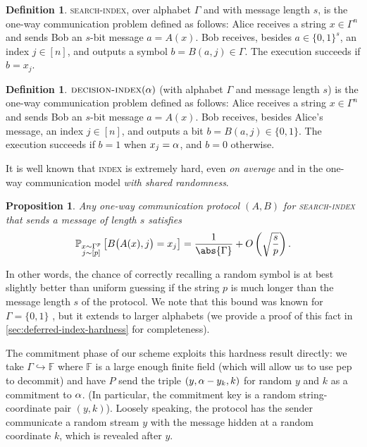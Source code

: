 \documentclass[a4paper,UKenglish,cleveref, autoref, thm-restate]{lipics-v2021}
\newtheorem{proposition}[theorem]{Proposition}
\theoremstyle{definition}
\newtheorem{definition}[theorem]{Definition}
\newcommand{\field}{\mathbb{F}}
\renewcommand{\P}{\mathbb P}
\newcommand{\bitset}{\{0,1\}}
\newcommand{\indexproblem}{\normalfont\textsc{index}\xspace}
\newcommand{\searchindex}{\normalfont\textsc{search-index}\xspace}
\newcommand{\decisionindex}{\normalfont\textsc{decision-index}\xspace}
\newcommand{\pepprotocol}{\textsf{pep}\xspace}
\newcommand{\pcommitlength}{p}
\newcommand{\pcommitstring}{y}
\newcommand{\alphabet}{\Gamma}
\def\fe#1{
    \ifnum#1=1
        \alpha
    \else
    \ifnum#1=2
        \beta
    \else
    \ifnum#1=3
        \gamma
    \fi\fi\fi
}
\begin{document}
\begin{definition}
    \label{def:search-index}
    \searchindex, over alphabet $\alphabet$ and with message length $s$, is the one-way communication problem defined as follows: Alice receives a string $x \in \alphabet^n$ and sends Bob an $s$-bit message $a = A(x)$. Bob receives, besides $a \in \bitset^s$, an index $j \in [n]$, and outputs a symbol $b = B(a, j) \in \alphabet$. The execution succeeds if $b = x_j$.
\end{definition}

\begin{definition}
    \label{def:decision-index}
    $\decisionindex(\fe1)$ (with alphabet $\alphabet$ and message length $s$) is the one-way communication problem defined as follows: Alice receives a string $x \in \alphabet^n$ and sends Bob an $s$-bit message $a = A(x)$. Bob receives, besides Alice's message, an index $j \in [n]$, and outputs a bit $b = B(a, j) \in \bitset$. The execution succeeds if $b = 1$ when $x_j = \fe1$, and $b = 0$ otherwise.
\end{definition}

It is well known that \indexproblem is extremely hard, even \emph{on average} and in the one-way communication model \emph{with shared randomness}. 

\begin{proposition}
\label{prop:index-hardness}
    Any one-way communication protocol $(A, B)$ for \searchindex that sends a message of length $s$ satisfies 
    \begin{equation*}
        \P_{\substack{x \sim \alphabet^\pcommitlength\\ j \sim [\pcommitlength]}}\left[B\big(A(x), j\big) = x_j\right] = \frac1{\abs{\alphabet}}+O\left(\sqrt{\frac{s}{\pcommitlength}}\right).
    \end{equation*}
\end{proposition}

In other words, the chance of correctly recalling a random symbol is at best slightly better than uniform guessing if the string $\pcommitlength$ is much longer than the message length $s$ of the protocol. We note that this bound was known for $\alphabet = \bitset$ \cite{RY20}, but it extends to larger alphabets (we provide a proof of this fact in \cref{sec:deferred-index-hardness} for completeness).

The commitment phase of our scheme exploits this hardness result directly: we take $\alphabet \hookrightarrow \field$ where $\field$ is a large enough finite field (which will allow us to use \pepprotocol to decommit) and have $P$ send the triple $(\pcommitstring, \fe1 - \pcommitstring_k, k)$ for random $\pcommitstring$ and $k$ as a commitment to $\fe1$. (In particular, the commitment key is a random string-coordinate pair $(\pcommitstring, k)$). Loosely speaking, the protocol has the sender communicate a random stream $\pcommitstring$ with the message hidden at a random coordinate $k$, which is revealed after $\pcommitstring$.
\end{document}

